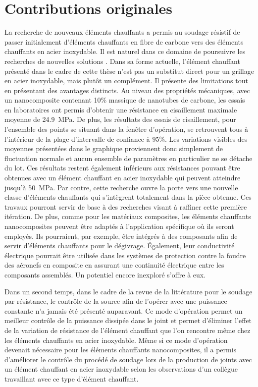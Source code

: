 \label{sec:Contributions}

\section{Contributions originales}

La recherche de nouveaux éléments chauffants a permis au soudage résistif de passer initialement d'éléments chauffants en fibre de carbone vers des éléments chauffants en acier inoxydable. 
Il est naturel dans ce domaine de poursuivre les recherches de nouvelles solutions \cite{Russello2019}. 
Dans sa forme actuelle, l'élément chauffant présenté dans le cadre de cette thèse n'est pas un substitut direct pour un grillage en acier inoxydable, mais plutôt un complément. 
Il présente des limitations tout en présentant des avantages distincts.
Au niveau des propriétés mécaniques, avec un nanocomposite contenant 10\% massique de nanotubes de carbone, les essais en laboratoires ont permis d'obtenir une résistance en cisaillement maximale moyenne de \SI{24.9}{\mega\pascal}. 
De plus, les résultats des essais de cisaillement, pour l'ensemble des points se situant dans la fenêtre d'opération, se retrouvent tous à l'intérieur de la plage d'intervalle de confiance à 95\%. 
Les variations visibles des moyennes présentées dans le graphique proviennent donc simplement de fluctuation normale et aucun ensemble de paramètres en particulier ne se détache du lot. 
Ces résultats restent également inférieurs aux résistances pouvant être obtenues avec un élément chauffant en acier inoxydable qui peuvent atteindre jusqu'à \SI{50}{\mega\pascal}. 
Par contre, cette recherche ouvre la porte vers une nouvelle classe d'éléments chauffants qui s'intègrent totalement dans la pièce obtenue. 
Ces travaux pourront servir de base à des recherches visant à raffiner cette première itération. 
De plus, comme pour les matériaux composites, les éléments chauffants nanocomposites peuvent être adaptés à l'application spécifique où ils seront employés. 
Ils pourraient, par exemple, être intégrés à des composants afin de servir d'éléments chauffants pour le dégivrage. 
Également, leur conductivité électrique pourrait être utilisée dans les systèmes de protection contre la foudre des aéronefs en composite en assurant une continuité électrique entre les composants assemblés. 
Un potentiel encore inexploré s'offre à eux. 

Dans un second temps, dans le cadre de la revue de la littérature pour le soudage par résistance, le contrôle de la source afin de l'opérer avec une puissance constante n'a jamais été présenté auparavant.  
Ce mode d'opération permet un meilleur contrôle de la puissance dissipée dans le joint et permet d'éliminer l'effet de la variation de résistance de l'élément chauffant que l'on rencontre même chez les éléments chauffants en acier inoxydable. 
Même si ce mode d'opération devenait nécessaire pour les éléments chauffants nanocomposites, il a permis d'améliorer le contrôle du procédé de soudage lors de la production de joints avec un élément chauffant en acier inoxydable selon les observations d'un collègue travaillant avec ce type d'élément chauffant. 

